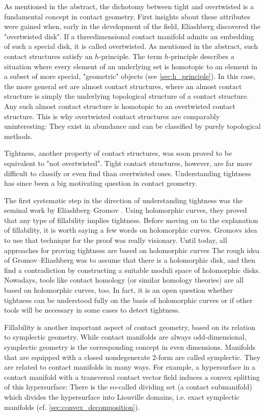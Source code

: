 As mentioned in the abstract, the dichotomy between tight and overtwisted is a fundamental concept in contact geometry.
First insights about these attributes were gained when, early in the development of the field, 
Eliashberg discovered the "overtwisted disk".
If a threedimensional contact manifold admits an embedding of such a special disk, it is called overtwisted.
As mentioned in the abstract, such contact structures satisfy an $h$-principle.
The term $h$-principle describes a situation where every element of an underlying set is homotopic to an
element in a subset of more special, "geometric" objects (see \cref{sec:h_principle}).
In this case, the more general set are almost contact structures, where an almost contact structure
is simply the underlying topological structure of a contact structure.
Any such almost contact structure is homotopic to an overtwisted contact structure.
This is why overtwisted contact structures are comparably uninteresting: They exist
in abundance and can be classified by purely topological methods.

Tightness, another property of contact structures, was soon proved to be equivalent to "not overtwisted".
Tight contact structures, however, are far more difficult to classify or even find than overtwisted ones.
Understanding tightness has since been a big motivating question in contact geometry.

The first systematic step in the direction of understanding tightness was the seminal work
by Eliashberg--Gromov \cite{Gromov85, Eliashberg91}. Using holomorphic curves, they proved that any type of fillability implies tightness.
Before moving on to the explanation of fillability, it is worth saying a few words on holomorphic curves.
Gromovs idea to use that technique for the proof was really visionary. 
Until today, all approaches for proving tightness are based on holomorphic curves 
The rough idea of Gromov--Eliashberg was to assume that there is a holomorphic disk, 
and then find a contradiction by constructing a suitable moduli space of holomorphic disks.
Nowadays, tools like contact homology (or similar homology theories) are all based on holomorphic curves, too.
In fact, it is an open question whether tightness can be understood fully on the basis of holomorphic curves 
or if other tools will be necessary in some cases to detect tightness.

Fillability is another important aspect of contact geometry, based on its relation to symplectic geometry.
While contact manifolds are always odd-dimensional, symplectic geometry is the corresponding concept in even dimensions.
Manifolds that are equipped with a closed nondegenerate 2-form are called symplectic. They are related
to contact manifolds in many ways.
For example, a hypersurface in a contact manifold with a transversal contact vector field
induces a convex splitting of this hypersurface: There is the so-called dividing set (a contact submanifold)
which divides the hypersurface into Liouville domains, i.e. exact symplectic manifolds (cf. \cref{sec:convex_decomposition}).

